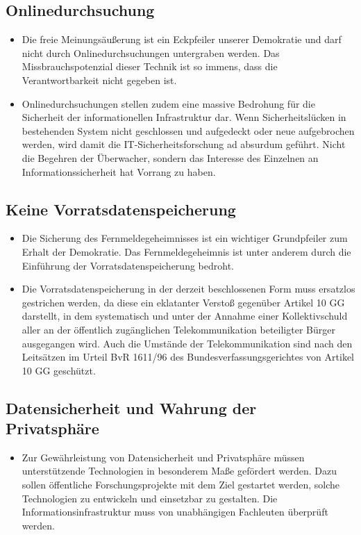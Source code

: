 \documentclass[10pt,a4paper,twocolumn,twoside,titlepage]{article}
\begin{document}
\subsection{Onlinedurchsuchung}

\begin{itemize}
\item Die freie Meinungsäußerung ist ein Eckpfeiler unserer Demokratie und darf nicht durch Onlinedurchsuchungen untergraben werden. Das Missbrauchspotenzial dieser Technik ist so immens, dass die Verantwortbarkeit nicht gegeben ist.
\item Onlinedurchsuchungen stellen zudem eine massive Bedrohung für die Sicherheit der informationellen Infrastruktur dar. Wenn Sicherheitslücken in bestehenden System nicht geschlossen und aufgedeckt oder neue aufgebrochen werden, wird damit die IT-Sicherheitsforschung ad absurdum geführt. Nicht die Begehren der Überwacher, sondern das Interesse des Einzelnen an Informationssicherheit hat Vorrang zu haben.
\end{itemize}

\subsection{Keine Vorratsdatenspeicherung}
\begin{itemize}
\item Die Sicherung des Fernmeldegeheimnisses ist ein wichtiger Grundpfeiler zum Erhalt der Demokratie. Das Fernmeldegeheimnis ist unter anderem durch die Einführung der Vorratsdatenspeicherung bedroht.
\item Die Vorratsdatenspeicherung in der derzeit beschlossenen Form muss ersatzlos gestrichen werden, da diese ein eklatanter Verstoß gegenüber Artikel 10 GG darstellt, in dem systematisch und unter der Annahme einer Kollektivschuld aller an der öffentlich zugänglichen Telekommunikation beteiligter Bürger ausgegangen wird. Auch die Umstände der Telekommunikation sind nach den Leitsätzen im Urteil BvR 1611/96 des Bundesverfassungsgerichtes von Artikel 10 GG geschützt.
\end{itemize}

\subsection{Datensicherheit und Wahrung der Privatsphäre}
\begin{itemize}
\item Zur Gewährleistung von Datensicherheit und Privatsphäre müssen unterstützende Technologien in besonderem Maße gefördert werden. Dazu sollen öffentliche Forschungsprojekte mit dem Ziel gestartet werden, solche Technologien zu entwickeln und einsetzbar zu gestalten. Die Informationsinfrastruktur muss von unabhängigen Fachleuten überprüft werden.
\end{itemize}
\end{document}
